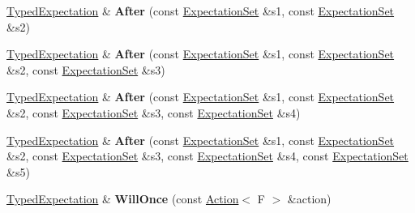 \begin{DoxyCompactItemize}
\mbox{\hyperlink{classtesting_1_1internal_1_1_typed_expectation}{Typed\+Expectation}} \& {\bfseries After} (const \mbox{\hyperlink{classtesting_1_1_expectation_set}{Expectation\+Set}} \&s1, const \mbox{\hyperlink{classtesting_1_1_expectation_set}{Expectation\+Set}} \&s2)
\item 
\mbox{\label{classtesting_1_1internal_1_1_typed_expectation_a95a341dd221901b5e51dd7cfdbdb3570}} 
\mbox{\hyperlink{classtesting_1_1internal_1_1_typed_expectation}{Typed\+Expectation}} \& {\bfseries After} (const \mbox{\hyperlink{classtesting_1_1_expectation_set}{Expectation\+Set}} \&s1, const \mbox{\hyperlink{classtesting_1_1_expectation_set}{Expectation\+Set}} \&s2, const \mbox{\hyperlink{classtesting_1_1_expectation_set}{Expectation\+Set}} \&s3)
\item 
\mbox{\label{classtesting_1_1internal_1_1_typed_expectation_a1749e368f659352ed8375512acafc178}} 
\mbox{\hyperlink{classtesting_1_1internal_1_1_typed_expectation}{Typed\+Expectation}} \& {\bfseries After} (const \mbox{\hyperlink{classtesting_1_1_expectation_set}{Expectation\+Set}} \&s1, const \mbox{\hyperlink{classtesting_1_1_expectation_set}{Expectation\+Set}} \&s2, const \mbox{\hyperlink{classtesting_1_1_expectation_set}{Expectation\+Set}} \&s3, const \mbox{\hyperlink{classtesting_1_1_expectation_set}{Expectation\+Set}} \&s4)
\item 
\mbox{\label{classtesting_1_1internal_1_1_typed_expectation_a72c0105b147ee2995d183c8e4109f6ca}} 
\mbox{\hyperlink{classtesting_1_1internal_1_1_typed_expectation}{Typed\+Expectation}} \& {\bfseries After} (const \mbox{\hyperlink{classtesting_1_1_expectation_set}{Expectation\+Set}} \&s1, const \mbox{\hyperlink{classtesting_1_1_expectation_set}{Expectation\+Set}} \&s2, const \mbox{\hyperlink{classtesting_1_1_expectation_set}{Expectation\+Set}} \&s3, const \mbox{\hyperlink{classtesting_1_1_expectation_set}{Expectation\+Set}} \&s4, const \mbox{\hyperlink{classtesting_1_1_expectation_set}{Expectation\+Set}} \&s5)
\item 
\mbox{\label{classtesting_1_1internal_1_1_typed_expectation_a41b0d15e44e95d52f4d5c310fb9e9683}} 
\mbox{\hyperlink{classtesting_1_1internal_1_1_typed_expectation}{Typed\+Expectation}} \& {\bfseries Will\+Once} (const \mbox{\hyperlink{classtesting_1_1_action}{Action}}$<$ F $>$ \&action)

\end{DoxyCompactItemize}
